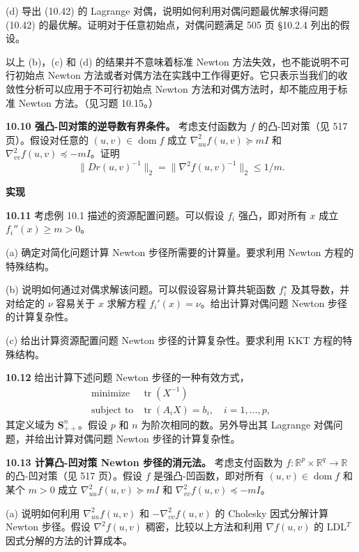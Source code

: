 \documentclass[UTF8,12pt,a4paper,fontset=fandol]{ctexart}
\begin{document}
(d) 导出 (10.42) 的 Lagrange 对偶，说明如何利用对偶问题最优解求得问题 (10.42) 的最优解。证明对于任意初始点，对偶问题满足 505 页 \S10.2.4 列出的假设。

以上 (b)，(c) 和 (d) 的结果并不意味着标准 Newton 方法失效，也不能说明不可行初始点 Newton 方法或者对偶方法在实践中工作得更好。它只表示当我们的收敛性分析可以应用于不可行初始点 Newton 方法和对偶方法时，却不能应用于标准 Newton 方法。（见习题 10.15。）

\noindent\textbf{10.10 强凸-凹对策的逆导数有界条件。}\quad
考虑支付函数为 $f$ 的凸-凹对策（见 517 页）。假设对任意的 $(u,v)\in\operatorname{dom} f$ 成立 $\nabla_{uu}^2 f(u,v)\succeq mI$ 和 $\nabla_{vv}^2 f(u,v)\preceq -mI$。证明
\[
\|Dr(u,v)^{-1}\|_2=\|\nabla^2 f(u,v)^{-1}\|_2\leq 1/m.
\]

\noindent\textbf{实现}

\noindent\textbf{10.11}\quad
考虑例 10.1 描述的资源配置问题。可以假设 $f_i$ 强凸，即对所有 $x$ 成立 $f_i''(x)\geq m>0$。

(a) 确定对简化问题计算 Newton 步径所需要的计算量。要求利用 Newton 方程的特殊结构。

(b) 说明如何通过对偶求解该问题。可以假设容易计算共轭函数 $f_i^\star$ 及其导数，并对给定的 $\nu$ 容易关于 $x$ 求解方程 $f_i'(x)=\nu$。给出计算对偶问题 Newton 步径的计算复杂性。

(c) 给出计算资源配置问题 Newton 步径的计算复杂性。要求利用 KKT 方程的特殊结构。

\noindent\textbf{10.12}\quad
给出计算下述问题 Newton 步径的一种有效方式，
\[
\begin{array}{ll}
\mbox{minimize} & \operatorname{tr}(X^{-1})\\
\mbox{subject to} & \operatorname{tr}(A_iX)=b_i,\quad i=1,\ldots,p,
\end{array}
\]
其定义域为 $\mathbf{S}_{++}^n$。假设 $p$ 和 $n$ 为阶次相同的数。另外导出其 Lagrange 对偶问题，并给出计算对偶问题 Newton 步径的计算复杂性。

\noindent\textbf{10.13 计算凸-凹对策 Newton 步径的消元法。}\quad
考虑支付函数为 $f:\mathbb{R}^p\times\mathbb{R}^q\to\mathbb{R}$ 的凸-凹对策（见 517 页）。假设 $f$ 是强凸-凹函数，即对所有 $(u,v)\in\operatorname{dom} f$ 和某个 $m>0$ 成立 $\nabla_{uu}^2 f(u,v)\succeq mI$ 和 $\nabla_{vv}^2 f(u,v)\preceq -mI$。

(a) 说明如何利用 $\nabla_{uu}^2f(u,v)$ 和 $-\nabla_{vv}^2f(u,v)$ 的 Cholesky 因式分解计算 Newton 步径。假设 $\nabla^2f(u,v)$ 稠密，比较以上方法和利用 $\nabla f(u,v)$ 的 LDL$^T$ 因式分解的方法的计算成本。
\end{document}
